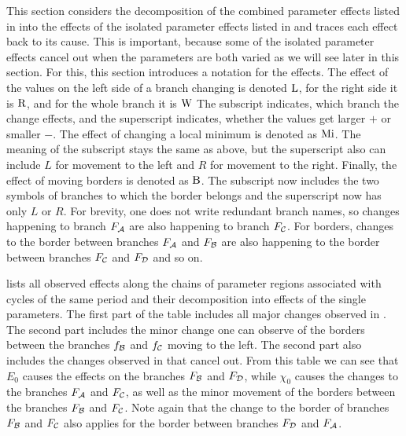 This section considers the decomposition of the combined parameter effects listed in  into the effects of the isolated parameter effects listed in  and traces each effect back to its cause.
This is important, because some of the isolated parameter effects cancel out when the parameters are both varied as we will see later in this section.
For this, this section introduces a notation for the effects.
The effect of the values on the left side of a branch changing is denoted $\operatorname{L}$, for the right side it is $\operatorname{R}$, and for the whole branch it is $\operatorname{W}$
The subscript indicates, which branch the change effects, and the superscript indicates, whether the values get larger $+$ or smaller $-$.
The effect of changing a local minimum is denoted as $\operatorname{Mi}$.
The meaning of the subscript stays the same as above, but the superscript also can include $L$ for movement to the left and $R$ for movement to the right.
Finally, the effect of moving borders is denoted as $\operatorname{B}$.
The subscript now includes the two symbols of branches to which the border belongs and the superscript now has only $L$ or $R$.
For brevity, one does not write redundant branch names, so changes happening to branch $F_{\mathcal{A}}$ are also happening to branch $F_{\mathcal{C}}$.
For borders, changes to the border between branches $F_{\mathcal{A}}$ and $F_{\mathcal{B}}$ are also happening to the border between branches $F_{\mathcal{C}}$ and $F_{\mathcal{D}}$ and so on.

 lists all observed effects along the chains of parameter regions associated with cycles of the same period and their decomposition into effects of the single parameters.
The first part of the table includes all major changes observed in .
The second part includes the minor change one can observe of the borders between the branches $f_{\mathcal{B}}$ and $f_{\mathcal{C}}$ moving to the left.
The second part also includes the changes observed in  that cancel out.
From this table we can see that $E_0$ causes the effects on the branches $F_{\mathcal{B}}$ and $F_{\mathcal{D}}$, while $\chi_0$ causes the changes to the branches $F_{\mathcal{A}}$ and $F_{\mathcal{C}}$, as well as the minor movement of the borders between the branches $F_{\mathcal{B}}$ and $F_{\mathcal{C}}$.
Note again that the change to the border of branches $F_{\mathcal{B}}$ and $F_{\mathcal{C}}$ also applies for the border between branches $F_{\mathcal{D}}$ and $F_{\mathcal{A}}$.

